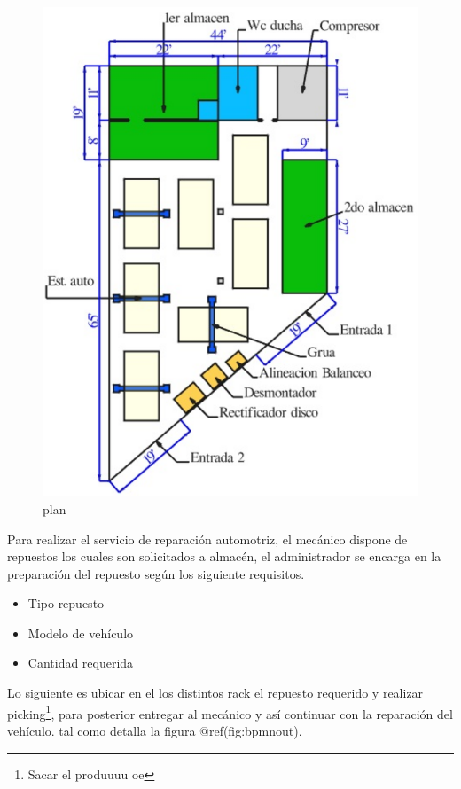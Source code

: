 \documentclass[
]{article}
\providecommand{\tightlist}{%
  \setlength{\itemsep}{0pt}\setlength{\parskip}{0pt}}
\begin{document}
\begin{figure}
\centering
\includegraphics{fig/plan.png}
\caption{plan}
\end{figure}

Para realizar el servicio de reparación automotriz, el mecánico dispone
de repuestos los cuales son solicitados a almacén, el administrador se
encarga en la preparación del repuesto según los siguiente requisitos.

\begin{itemize}
\tightlist
\item
  Tipo repuesto
\item
  Modelo de vehículo
\item
  Cantidad requerida
\end{itemize}

Lo siguiente es ubicar en el los distintos rack el repuesto requerido y
realizar picking\footnote{Sacar el produuuu oe}, para posterior entregar
al mecánico y así continuar con la reparación del vehículo. tal como
detalla la figura @ref(fig:bpmnout).
\end{document}
